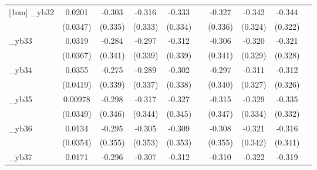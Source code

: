 \begin{table}[htbp]
\begin{tabular}{l*{9}{c}}
[1em]
\_yb32       &      0.0201         &      -0.303         &      -0.316         &      -0.333         &                     &      -0.327         &      -0.342         &      -0.344         &                     \\
            &    (0.0347)         &     (0.335)         &     (0.333)         &     (0.334)         &                     &     (0.336)         &     (0.324)         &     (0.322)         &                     \\
[1em]
\_yb33       &      0.0319         &      -0.284         &      -0.297         &      -0.312         &                     &      -0.306         &      -0.320         &      -0.321         &                     \\
            &    (0.0367)         &     (0.341)         &     (0.339)         &     (0.339)         &                     &     (0.341)         &     (0.329)         &     (0.328)         &                     \\
[1em]
\_yb34       &      0.0355         &      -0.275         &      -0.289         &      -0.302         &                     &      -0.297         &      -0.311         &      -0.312         &                     \\
            &    (0.0419)         &     (0.339)         &     (0.337)         &     (0.338)         &                     &     (0.340)         &     (0.327)         &     (0.326)         &                     \\
[1em]
\_yb35       &     0.00978         &      -0.298         &      -0.317         &      -0.327         &                     &      -0.315         &      -0.329         &      -0.335         &                     \\
            &    (0.0349)         &     (0.346)         &     (0.344)         &     (0.345)         &                     &     (0.347)         &     (0.334)         &     (0.332)         &                     \\
[1em]
\_yb36       &      0.0134         &      -0.295         &      -0.305         &      -0.309         &                     &      -0.308         &      -0.321         &      -0.316         &                     \\
            &    (0.0354)         &     (0.355)         &     (0.353)         &     (0.353)         &                     &     (0.355)         &     (0.342)         &     (0.341)         &                     \\
[1em]
\_yb37       &      0.0171         &      -0.296         &      -0.307         &      -0.312         &                     &      -0.310         &      -0.322         &      -0.319         &                     \\

\end{tabular}
\end{table}
